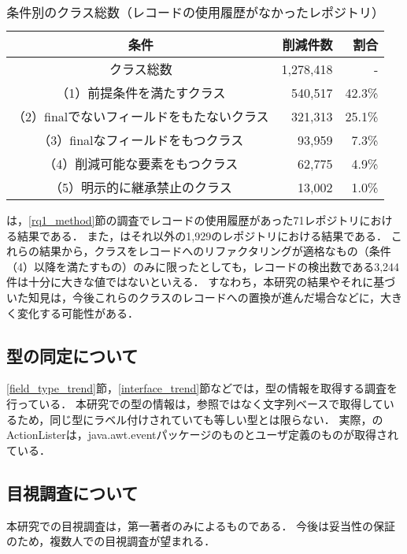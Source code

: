 \begin{table}[t]
  \caption{条件別のクラス総数（レコードの使用履歴がなかったレポジトリ）}
  \label{class_immutability_1929}
  \centering
  \begin{tabular}{c||r|r}
      \hline
      条件 & 削減件数 & 割合\\
      \hline\hline
      クラス総数 & 1,278,418 & -\\
      （1）前提条件を満たすクラス & 540,517 & 42.3\%\\
      （2）finalでないフィールドをもたないクラス & 321,313 & 25.1\%\\
      （3）finalなフィールドをもつクラス & 93,959 & 7.3\%\\
      （4）削減可能な要素をもつクラス & 62,775 & 4.9\%\\
      （5）明示的に継承禁止のクラス & 13,002 & 1.0\%\\
      \hline
  \end{tabular}
\end{table}

は，\ref{rq1_method}節の調査でレコードの使用履歴があった71レポジトリにおける結果である．
また，はそれ以外の1,929のレポジトリにおける結果である．
これらの結果から，クラスをレコードへのリファクタリングが適格なもの（条件（4）以降を満たすもの）のみに限ったとしても，レコードの検出数である3,244件は十分に大きな値ではないといえる．
すなわち，本研究の結果やそれに基づいた知見は，今後これらのクラスのレコードへの置換が進んだ場合などに，大きく変化する可能性がある．

\subsection{型の同定について}
\ref{field_type_trend}節，\ref{interface_trend}節などでは，型の情報を取得する調査を行っている．
本研究での型の情報は，参照ではなく文字列ベースで取得しているため，同じ型にラベル付けされていても等しい型とは限らない．
実際，のActionListerは，java.awt.eventパッケージのものとユーザ定義のものが取得されている．

\subsection{目視調査について}
本研究での目視調査は，第一著者のみによるものである．
今後は妥当性の保証のため，複数人での目視調査が望まれる．